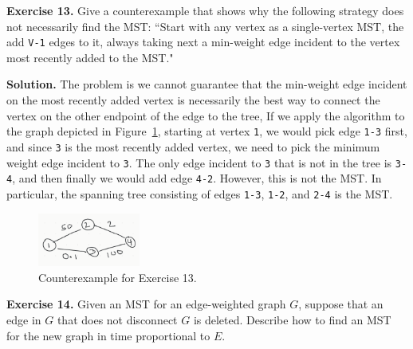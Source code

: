 \documentclass[12pt, a4paper]{article}
\newenvironment{ex}[2][Exercise]
{\par\medskip\noindent \textbf{#1 #2.}}
{\medskip}
\newenvironment{sol}[1][Solution]
{\par\medskip\noindent \textbf{#1.} }
{\medskip}
\begin{document}
	\begin{ex}{13}
		Give a counterexample that shows why the following strategy does not necessarily
		find the MST: ``Start with any vertex as a single-vertex MST, the add \texttt{V-1}
		edges to it, always taking next a min-weight edge incident to the vertex most
		recently added to the MST."
	\end{ex}
	\begin{sol}
		The problem is we cannot guarantee that the min-weight edge incident on
		the most recently added vertex is necessarily the best way to connect
		the vertex on the other endpoint of the edge to the tree,
		If we apply the algorithm to the graph depicted in Figure~\ref{fig:ex-13},
		starting at vertex \texttt{1}, we would pick edge \texttt{1-3} first,
		and since \texttt{3} is the most recently added vertex, we need to pick
		the minimum weight edge incident to \texttt{3}. The only edge incident to
		\texttt{3} that is not in the tree is \texttt{3-4}, and then finally we would
		add edge \texttt{4-2}. However, this is not the MST. In particular, the spanning
		tree consisting of edges \texttt{1-3}, \texttt{1-2}, and \texttt{2-4}
		is the MST.
		\begin{figure}
			\centering
			\includegraphics[width=0.3\textwidth]{exercise-13}
			\caption{Counterexample for Exercise 13.}
			\label{fig:ex-13}
		\end{figure}
	\end{sol}
	\begin{ex}{14}
		Given an MST for an edge-weighted graph $G$, suppose that an edge in $G$ that
		does not disconnect $G$ is deleted. Describe how to find an MST for the new graph
		in time proportional to $E$.
	\end{ex}
\end{document}
